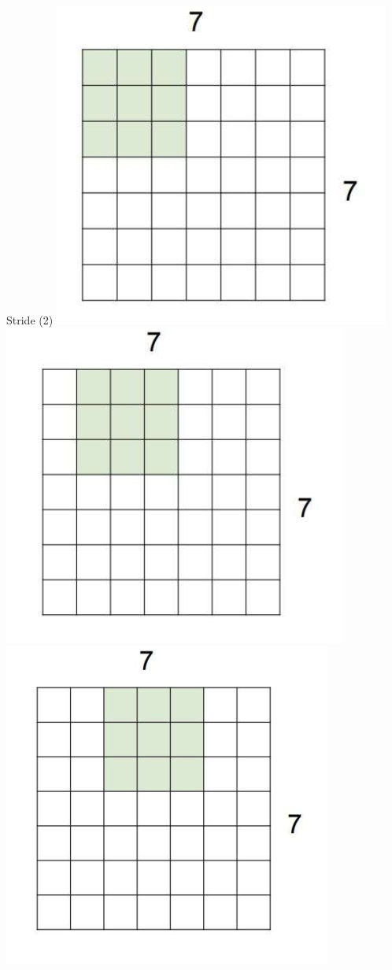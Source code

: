 \documentclass[default, aspectratio=169]{beamer}
\begin{document}
	\begin{frame}{Stride (2)}
		\includegraphics[keepaspectratio, scale=0.5]{pic/stride11.png}
		\includegraphics[keepaspectratio, scale=0.5]{pic/stride12.png}
		\includegraphics[keepaspectratio, scale=0.5]{pic/stride13.png}
		

\end{frame}
\end{document}
